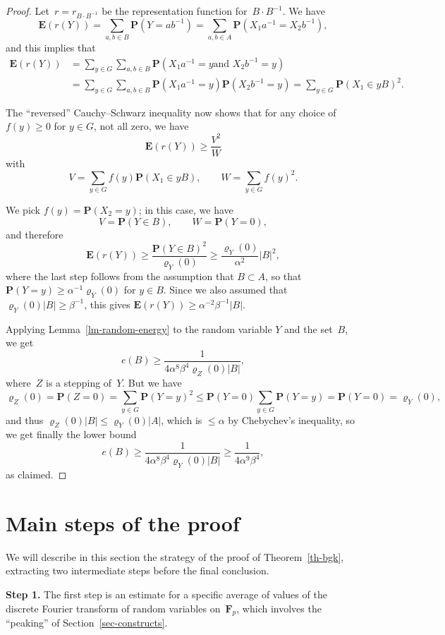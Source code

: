 \documentclass[12pt]{amsart}
\renewcommand{\leq}{\leqslant}
\renewcommand{\geq}{\geqslant}
\numberwithin{equation}{section}
\newcommand{\Ff}{\mathbf{F}}
\newcommand{\proba}{\mathbf{P}}
\newcommand{\expect}{\mathbf{E}}
\renewcommand{\rho}{\varrho}
\theoremstyle{plain}
\theoremstyle{remark}
\theoremstyle{definition}
\renewcommand{\geq}{\geqslant}
\renewcommand{\leq}{\leqslant}
\begin{document}
\begin{proof}
  Let~$r=r_{B\cdot B^{-1}}$ be the representation function
  for~$B\cdot B^{-1}$.  We have
  $$
  \expect(r(Y))=\sum_{a,b\in B}\proba(Y=ab^{-1})=
  \sum_{a,b\in A}\proba(X_1a^{-1}=X_2b^{-1}),
  $$
  and this implies that
  \begin{align*}
    \expect(r(Y))&=\sum_{y\in G}\sum_{a,b\in B}\proba(X_1a^{-1}=y\text{
      and } X_2b^{-1}=y)
    \\
    &=\sum_{y\in G}\sum_{a,b\in B}\proba(X_1a^{-1}=y)\proba(X_2b^{-1}=y)
    =\sum_{y\in G}\proba(X_1\in yB)^2.
  \end{align*}

  The ``reversed'' Cauchy--Schwarz inequality now shows that for any
  choice of $f(y)\geq 0$ for $y\in G$, not all zero, we have
  $$
  \expect(r(Y))\geq \frac{V^2}{W}
  $$
  with
  $$
  V=\sum_{y\in G}f(y)\proba(X_1\in yB), \quad\quad
  W=\sum_{y\in G}f(y)^2.
  $$
  
  We pick $f(y)=\proba(X_2=y)$; in this case, we have
  $$
  V=\proba(Y\in B),\quad\quad W=\proba(Y=0),
  $$
  and therefore
  $$
  \expect(r(Y))\geq \frac{\proba(Y\in B)^2}{\rho_Y(0)}\geq
  \frac{\rho_Y(0)}{\alpha^2} |B|^2,
  $$
  where the last step follows from the assumption that $B\subset A$, so
  that $\proba(Y=y)\geq \alpha^{-1}\rho_Y(0)$ for $y\in B$.  Since we
  also assumed that $\rho_Y(0)|B|\geq \beta^{-1}$, this gives
  $\expect(r(Y))\geq \alpha^{-2}\beta^{-1}|B|$.

  Applying Lemma~\ref{lm-random-energy} to the random variable $Y$ and
  the set~$B$, we get
  $$
  e(B)\geq \frac{1}{4\alpha^8\beta^4\rho_Z(0)|B|},
  $$
  where~$Z$ is a stepping of~$Y$.  But we have
  $$
  \rho_Z(0)=\proba(Z=0)=\sum_{y\in G} \proba(Y=y)^2\leq
  \proba(Y=0)\sum_{y\in G}\proba(Y=y)=\proba(Y=0)=\rho_Y(0),
  $$
  and thus $\rho_Z(0)|B|\leq\rho_Y(0)|A|$, which is $\leq \alpha$ by
  Chebychev's inequality, so we get finally the lower bound
  $$
  e(B)\geq \frac{1}{4\alpha^8\beta^4\rho_Y(0)|B|}\geq
  \frac{1}{4\alpha^9\beta^4},
  $$
  as claimed.
\end{proof}

\section{Main steps of the proof}

We will describe in this section the strategy of the proof of
Theorem~\ref{th-bgk}, extracting two intermediate steps before the final
conclusion.

\par
\medskip
\par
\textbf{Step 1.} The first step is an estimate for a specific average of
values of the discrete Fourier transform of random variables on~$\Ff_p$,
which involves the ``peaking'' of Section~\ref{sec-constructs}.
\end{document}
